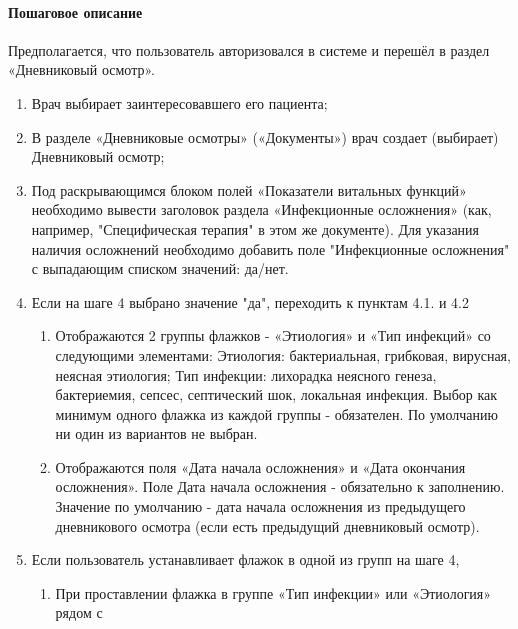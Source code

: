 \documentclass[a4paper,8pt]{report} %
\begin{document}
{    \paragraph*{Пошаговое описание}
        Предполагается, что пользователь авторизовался в системе и перешёл в раздел
        «Дневниковый осмотр».
        \begin{enumerate}
           \item Врач выбирает заинтересовавшего его пациента;
           \item В разделе «Дневниковые осмотры» («Документы») врач создает (выбирает) Дневниковый осмотр;
           \item Под раскрывающимся блоком полей «Показатели витальных функций» необходимо
                        вывести заголовок раздела «Инфекционные осложнения» (как, например,
                        "Специфическая терапия" в этом же документе). Для указания наличия осложнений
                        необходимо добавить поле "Инфекционные осложнения" с выпадающим списком
                        значений: да/нет.
           \item Если на шаге 4 выбрано значение "да", переходить к пунктам 4.1. и 4.2
              \begin{enumerate}[label*=\arabic*.]
                  \item Отображаются 2 группы флажков - «Этиология» и «Тип инфекций» со следующими
                        элементами: Этиология: бактериальная, грибковая, вирусная, неясная этиология;
                        Тип инфекции: лихорадка неясного генеза, бактериемия, сепсес, септический шок,
                        локальная инфекция. Выбор как минимум одного флажка из каждой группы -
                        обязателен. По умолчанию ни один из вариантов не выбран.
                  \item Отображаются поля «Дата начала осложнения» и «Дата окончания осложнения».
                        Поле Дата начала осложнения - обязательно к заполнению. Значение по умолчанию
                        - дата начала осложнения из предыдущего дневникового осмотра (если есть
                        предыдущий дневниковый осмотр).
                \end{enumerate}
           \item Если пользователь устанавливает флажок в одной из групп на шаге 4,
              \begin{enumerate}[label*=\arabic*.]
                 \item При проставлении флажка в группе «Тип инфекции» или «Этиология» рядом с

\end{enumerate}
\end{enumerate}}
\end{document}
